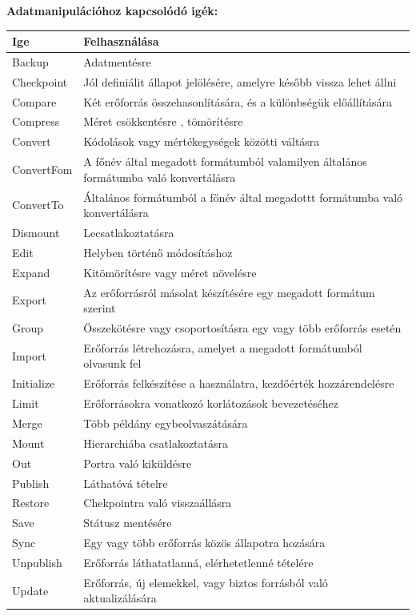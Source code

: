 \documentclass[12pt,oneside,justify,table]{book}
\begin{document}
\begin{appendices}
\noindent \textbf{Adatmanipulációhoz kapcsolódó igék:} \cite{VerbsData}\\
\begin{tabularx}{\linewidth}{l|X}
\rowcolor{blue!50}
\textbf{Ige} & \textbf{Felhasználása} \\
\hline
Backup & Adatmentésre \\
Checkpoint & Jól definiálit állapot jelölésére, amelyre később vissza lehet állni \\
Compare & Két erőforrás összehasonlítására, és a különbségük előállítására \\
Compress & Méret csökkentésre , tömörítésre \\
Convert & Kódolások vagy mértékegységek közötti váltásra \\
ConvertFom & A főnév által megadott formátumból valamilyen általános formátumba való konvertálásra \\
ConvertTo & Általános formátumból a főnév által megadottt formátumba való konvertálásra \\
Dismount & Lecsatlakoztatásra \\
Edit & Helyben történő módosításhoz \\
Expand & Kitömörítésre vagy méret növelésre \\
Export & Az erőforrásról másolat készítésére egy megadott formátum szerint \\
Group & Összekötésre vagy csoportosításra egy vagy több erőforrás esetén \\
Import & Erőforrás létrehozásra, amelyet a megadott formátumból olvasunk fel \\
Initialize & Erőforrás felkészítése a használatra, kezdőérték hozzárendelésre \\
Limit & Erőforrásokra vonatkozó korlátozások bevezetéséhez \\
Merge & Több példány egybeolvaszátására \\
Mount & Hierarchiába csatlakoztatásra \\
Out & Portra való kiküldésre \\
Publish & Láthatóvá tételre \\
Restore & Chekpointra való visszaállásra \\
Save & Státusz mentésére \\
Sync & Egy vagy több erőforrás közös állapotra hozására \\
Unpublish & Erőforrás láthatatlanná, elérhetetlenné tételére \\
Update & Erőforrás, új elemekkel, vagy biztos forrásból való aktualizálására \\
\end{tabularx}
\break


\end{appendices}
\end{document}
